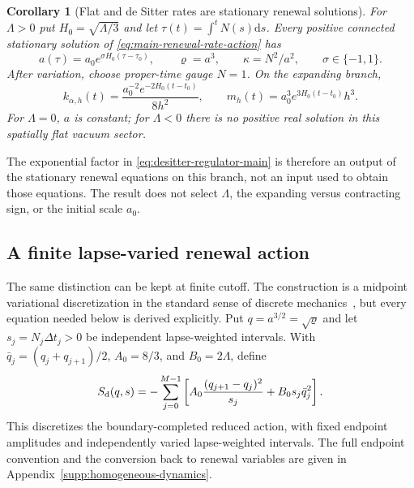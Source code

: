 \documentclass[11pt]{article}
\numberwithin{equation}{section}
\newtheorem{corollary}[corollary]{Corollary}
\theoremstyle{definition}
\theoremstyle{remark}
\newcommand{\dd}{\mathrm d}
\begin{document}
\begin{corollary}[Flat and de Sitter rates are stationary renewal solutions]
\label{cor:main-derived-desitter-rates}
For $\Lambda>0$ put $H_0=\sqrt{\Lambda/3}$ and let
$\tau(t)=\int^tN(s)\dd s$.  Every positive connected stationary solution of
\eqref{eq:main-renewal-rate-action} has
\begin{equation}
 a(\tau)=a_0e^{\sigma H_0(\tau-\tau_0)},\qquad
 \varrho=a^3,\qquad
 \kappa=N^2/a^2,
 \qquad \sigma\in\{-1,1\}.
 \label{eq:main-stationary-homogeneous-solutions}
\end{equation}
After variation, choose proper-time gauge $N=1$.  On the expanding branch,
\begin{equation}
 k_{\alpha,h}(t)=
 \frac{a_0^{-2}e^{-2H_0(t-t_0)}}{8h^2},\qquad
 m_h(t)=a_0^3e^{3H_0(t-t_0)}h^3.
 \label{eq:desitter-regulator-main}
\end{equation}
For $\Lambda=0$, $a$ is constant; for $\Lambda<0$ there is no positive real
solution in this spatially flat vacuum sector.
\end{corollary}

The exponential factor in \eqref{eq:desitter-regulator-main} is therefore an
output of the stationary renewal equations on this branch, not an input used to
obtain those equations.  The result does not select $\Lambda$, the expanding
versus contracting sign, or the initial scale $a_0$.

\subsection{A finite lapse-varied renewal action}
\label{subsec:finite-homogeneous-action-main}

The same distinction can be kept at finite cutoff.  The construction is a
midpoint variational discretization in the standard sense of discrete
mechanics~\cite{MarsdenWest2001}, but every equation needed below is derived
explicitly.  Put
$q=a^{3/2}=\sqrt\varrho$ and let
$s_j=N_j\Delta t_j>0$ be independent lapse-weighted intervals.  With
$\bar q_j=(q_j+q_{j+1})/2$, $A_0=8/3$, and $B_0=2\Lambda$, define
\begin{equation}
 S_{\rm d}(q,s)
 =-\sum_{j=0}^{M-1}\left[
 A_0\frac{(q_{j+1}-q_j)^2}{s_j}
 +B_0s_j\bar q_j^2\right].
 \label{eq:main-discrete-homogeneous-action}
\end{equation}
This discretizes the boundary-completed reduced action, with fixed
endpoint amplitudes and independently varied lapse-weighted intervals.
The full endpoint convention and the conversion back to renewal variables
are given in Appendix~\ref{supp:homogeneous-dynamics}.
\end{document}
